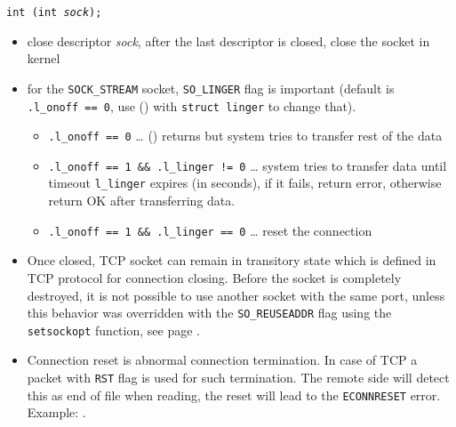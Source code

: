 

\begin{slide}
\setlength{\baselineskip}{0.8\baselineskip}
\texttt{int (int \emph{sock});}
\begin{itemize}
\item close descriptor \emph{sock}, after the last descriptor is closed, close
the socket in kernel
\item for the \texttt{SOCK\_STREAM} socket,
\texttt{SO\_LINGER} flag is important (default is \texttt{.l\_onoff~==~0}, use
() with \texttt{struct linger} to change that).
    \begin{itemize}
    \item \texttt{.l\_onoff~==~0} \dots{} () returns but system
    tries to transfer rest of the data
    \item \texttt{.l\_onoff~==~1~\&\&~.l\_linger~!=~0} \dots{} system tries to
    transfer data until timeout \texttt{l\_linger} expires (in seconds), if it
    fails, return error, otherwise return OK after transferring data.
    \item \texttt{.l\_onoff~==~1~\&\&~.l\_linger~==~0} \dots{} reset the
    connection
    \end{itemize}
\end{itemize}
\end{slide}


\begin{itemize}
\item Once closed, TCP socket can remain in transitory state which is defined in
TCP protocol for connection closing. Before the socket is completely destroyed,
it is not possible to use another socket with the same port, unless this
behavior was overridden with the \texttt{SO\_REUSEADDR} flag using the
\texttt{setsockopt} function, see page \pageref{SETSOCKOPT}.
\item Connection reset is abnormal connection termination. In case of TCP
a packet with \texttt{RST} flag is used for such termination. The remote side
will detect this as end of file when reading, the reset will lead to the
\texttt{ECONNRESET} error. Example: .
\end{itemize}



